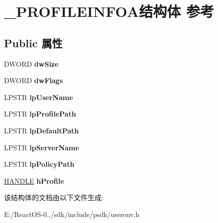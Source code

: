 \hypertarget{struct___p_r_o_f_i_l_e_i_n_f_o_a}{}\section{\+\_\+\+P\+R\+O\+F\+I\+L\+E\+I\+N\+F\+O\+A结构体 参考}
\label{struct___p_r_o_f_i_l_e_i_n_f_o_a}
\subsection*{Public 属性}
\begin{DoxyCompactItemize}
\item 
\mbox{\label{struct___p_r_o_f_i_l_e_i_n_f_o_a_a78d4123b6f31da7920ecff699ec0eb5f}} 
D\+W\+O\+RD {\bfseries dw\+Size}
\item 
\mbox{\label{struct___p_r_o_f_i_l_e_i_n_f_o_a_a34aa3eaa24a3845d86774a07391ab2c5}} 
D\+W\+O\+RD {\bfseries dw\+Flags}
\item 
\mbox{\label{struct___p_r_o_f_i_l_e_i_n_f_o_a_ac8bdc9c39960dbfcbd24e50472709bf2}} 
L\+P\+S\+TR {\bfseries lp\+User\+Name}
\item 
\mbox{\label{struct___p_r_o_f_i_l_e_i_n_f_o_a_adcf83adcedefd55cb220c68da17ffd11}} 
L\+P\+S\+TR {\bfseries lp\+Profile\+Path}
\item 
\mbox{\label{struct___p_r_o_f_i_l_e_i_n_f_o_a_a60b92cc2228155460f236c39a15d7c28}} 
L\+P\+S\+TR {\bfseries lp\+Default\+Path}
\item 
\mbox{\label{struct___p_r_o_f_i_l_e_i_n_f_o_a_a7ebecffc07a804fa46e8750ac5414608}} 
L\+P\+S\+TR {\bfseries lp\+Server\+Name}
\item 
\mbox{\label{struct___p_r_o_f_i_l_e_i_n_f_o_a_a6e19e8b9e68a12101569bd6cc3fddc4d}} 
L\+P\+S\+TR {\bfseries lp\+Policy\+Path}
\item 
\mbox{\label{struct___p_r_o_f_i_l_e_i_n_f_o_a_a3b42a01d2eaeea616cc33bc16bd95a5c}} 
\hyperlink{interfacevoid}{H\+A\+N\+D\+LE} {\bfseries h\+Profile}
\end{DoxyCompactItemize}


该结构体的文档由以下文件生成\+:\begin{DoxyCompactItemize}
\item 
E\+:/\+React\+O\+S-\/0../sdk/include/psdk/userenv.\+h\end{DoxyCompactItemize}
